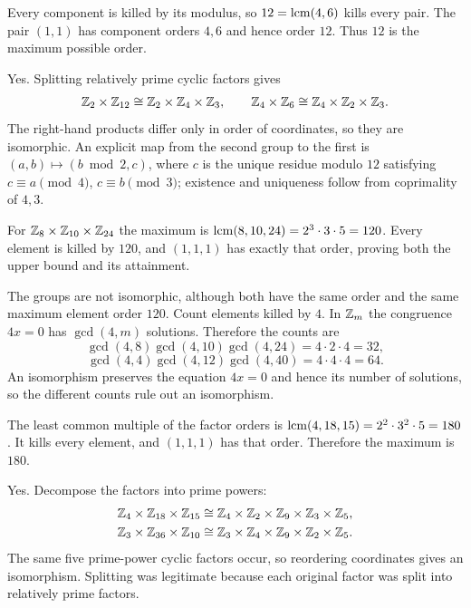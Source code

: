 Every component is killed by its modulus, so $12=\operatorname{lcm}(4,6)$ kills every pair. The pair $(1,1)$ has component orders $4,6$ and hence order $12$. Thus $12$ is the maximum possible order.

Yes. Splitting relatively prime cyclic factors gives
\[\mathbb{Z}_2\times\mathbb{Z}_{12}\cong\mathbb{Z}_2\times\mathbb{Z}_4\times\mathbb{Z}_3,
\qquad\mathbb{Z}_4\times\mathbb{Z}_6\cong\mathbb{Z}_4\times\mathbb{Z}_2\times\mathbb{Z}_3.\]
The right-hand products differ only in order of coordinates, so they are isomorphic. An explicit map from the second group to the first is $(a,b)\mapsto(b\bmod2,c)$, where $c$ is the unique residue modulo $12$ satisfying $c\equiv a\pmod4$, $c\equiv b\pmod3$; existence and uniqueness follow from coprimality of $4,3$.

For $\mathbb{Z}_8\times\mathbb{Z}_{10}\times\mathbb{Z}_{24}$ the maximum is $\operatorname{lcm}(8,10,24)=2^3\cdot3\cdot5=120$. Every element is killed by $120$, and $(1,1,1)$ has exactly that order, proving both the upper bound and its attainment.

The groups are not isomorphic, although both have the same order and the same maximum element order $120$. Count elements killed by $4$. In $\mathbb{Z}_m$ the congruence $4x=0$ has $\gcd(4,m)$ solutions. Therefore the counts are
\[\gcd(4,8)\gcd(4,10)\gcd(4,24)=4\cdot2\cdot4=32,\]
\[\gcd(4,4)\gcd(4,12)\gcd(4,40)=4\cdot4\cdot4=64.\]
An isomorphism preserves the equation $4x=0$ and hence its number of solutions, so the different counts rule out an isomorphism.

The least common multiple of the factor orders is $\operatorname{lcm}(4,18,15)=2^2\cdot3^2\cdot5=180$. It kills every element, and $(1,1,1)$ has that order. Therefore the maximum is $180$.

Yes. Decompose the factors into prime powers:
\[\begin{aligned}
\mathbb{Z}_4\times\mathbb{Z}_{18}\times\mathbb{Z}_{15}&\cong\mathbb{Z}_4\times\mathbb{Z}_2\times\mathbb{Z}_9\times\mathbb{Z}_3\times\mathbb{Z}_5,\\
\mathbb{Z}_3\times\mathbb{Z}_{36}\times\mathbb{Z}_{10}&\cong\mathbb{Z}_3\times\mathbb{Z}_4\times\mathbb{Z}_9\times\mathbb{Z}_2\times\mathbb{Z}_5.
\end{aligned}\]
The same five prime-power cyclic factors occur, so reordering coordinates gives an isomorphism. Splitting was legitimate because each original factor was split into relatively prime factors.

